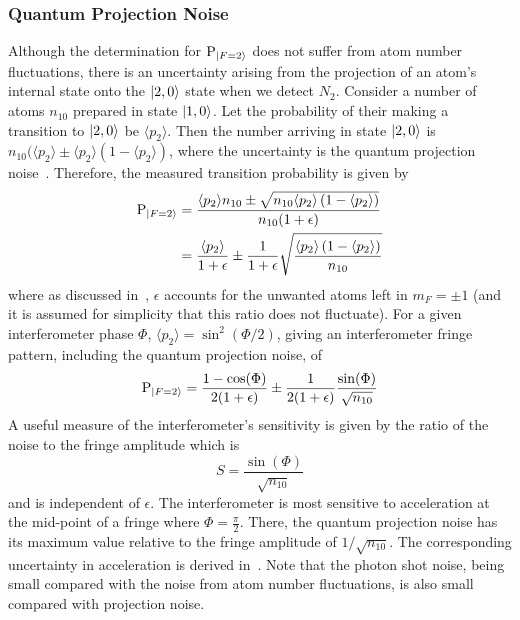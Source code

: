 \subsubsection{Quantum Projection Noise}
Although the determination for
$\text{P}_{\ket{F=2}}$ does not suffer from atom number fluctuations,
there is an uncertainty arising from the
projection of an atom's internal state onto 
the $\ket{2,0}$ state when we detect $N_2$. 
Consider a number of atoms $n_{10}$ prepared in state $\ket{1,0}$. Let
the probability of their making a transition to $\ket{2,0}$ be
$\langle p_2\rangle$. Then the number arriving in state $\ket{2,0}$ is
$n_{10} (\langle p_2 \rangle \pm \langle p_2 \rangle \left( 1- \langle
p_2 \rangle \right)$, where the uncertainty is the quantum projection
noise~\cite{Bollinger1996}. Therefore, the measured transition probability is given by
\begin{align}
  \text{P}_{\ket{F=2}} &= \frac{\langle p_2 \rangle n_{10} \pm \sqrt{n_{10}
  \langle p_2 \rangle \left( 1- \langle
p_2 \rangle \right)}}{n_{10}(1+\epsilon)}
  \nonumber \\
                &= \frac{\langle p_2 \rangle}{1+\epsilon} \pm
                \frac{1}{1+\epsilon} \sqrt{\frac{\langle p_2 \rangle
                    \left(1- \langle
                p_2 \rangle \right)}{n_{10}}} 
                \label{eq:prob_noise}
\end{align}
where as discussed in~, $\epsilon$
accounts for the unwanted atoms left in $m_F = \pm 1$ 
(and it is assumed for simplicity that this ratio
does not fluctuate).  
For a given interferometer phase $\Phi$,
$\langle p_2 \rangle = \sin^2(\Phi/2)$, giving an interferometer
fringe pattern, including the quantum projection noise, of
\begin{equation}
  \text{P}_{\ket{F=2}} = \frac{1-\cos(\Phi)}{2(1+\epsilon)} \pm
  \frac{1}{2(1+\epsilon)}\frac{\sin(\Phi)}{\sqrt{n_{10}}}
\end{equation}
A useful measure of the interferometer's sensitivity is given by the
ratio of the noise to the fringe amplitude which is
\begin{equation}
  S = \frac{\sin(\Phi)}{\sqrt{n_{10}}}
  \label{eq:sens_proj}
\end{equation}
and is independent of $\epsilon$. The interferometer is most sensitive
to acceleration at the mid-point
of a fringe where $\Phi = \frac{\pi}{2}$. There, the quantum
projection noise has its maximum value relative to the fringe
amplitude of $1/\sqrt{n_{10}}$. The corresponding uncertainty in
acceleration is derived in~. Note that
the photon shot noise, being small compared with the noise from atom
number fluctuations, is also small compared with projection noise.


